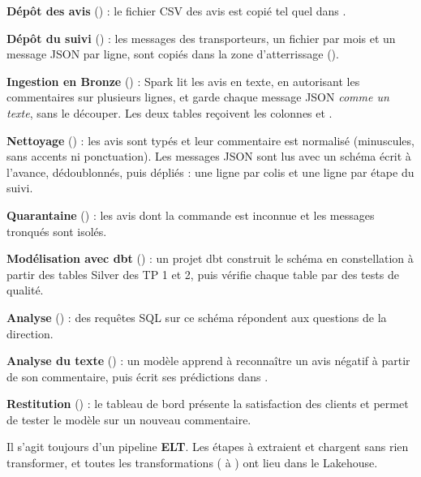 \begin{description}[leftmargin=1.4em,labelindent=0pt,itemsep=3pt,font=\normalfont]
\item[\etape{1}] \textbf{Dépôt des avis} () : le fichier CSV des avis est copié tel quel dans
  .
\item[\etape{2}] \textbf{Dépôt du suivi} () : les messages des transporteurs, un fichier par mois et un
  message JSON par ligne, sont copiés dans la zone d'atterrissage ().
\item[\etape{3}] \textbf{Ingestion en Bronze} () : Spark lit les avis en texte, en autorisant les
  commentaires sur plusieurs lignes, et garde chaque message JSON \emph{comme un texte}, sans le
  découper. Les deux tables reçoivent les colonnes  et .
\item[\etape{4}] \textbf{Nettoyage} () : les avis sont typés et leur
  commentaire est normalisé (minuscules, sans accents ni ponctuation). Les messages JSON sont lus avec
  un schéma écrit à l'avance, dédoublonnés, puis \og dépliés \fg{} : une ligne par colis et une
  ligne par étape du suivi.
\item[\etape{5}] \textbf{Quarantaine} () : les avis dont la commande est inconnue et les messages
  tronqués sont isolés.
\item[\etape{6}] \textbf{Modélisation avec dbt} () : un projet dbt construit le schéma en constellation à partir
  des tables Silver des TP 1 et 2, puis vérifie chaque table par des tests de qualité.
\item[\etape{7}] \textbf{Analyse} () : des requêtes SQL sur ce schéma répondent aux questions de la direction.
\item[\etape{8}] \textbf{Analyse du texte} () : un modèle apprend à reconnaître un avis négatif à partir
  de son commentaire, puis écrit ses prédictions dans .
\item[\etape{9}] \textbf{Restitution} () : le tableau de bord présente la satisfaction des clients et
  permet de tester le modèle sur un nouveau commentaire.
\end{description}

Il s'agit toujours d'un pipeline \textbf{ELT}. Les étapes  à  extraient et chargent
sans rien transformer, et toutes les transformations ( à ) ont lieu dans le Lakehouse.

